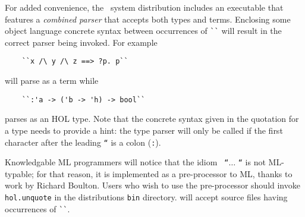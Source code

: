 For added convenience, the \HOL\ system distribution includes an
executable that features a {\it combined parser\/} that accepts both
types and terms. Enclosing some object language concrete syntax
between occurrences of \verb+``+ will result in the correct parser
being invoked. For example

\begin{verbatim}
    ``x /\ y /\ z ==> ?p. p``
\end{verbatim}

\noindent will parse as a term while

\begin{verbatim}
    ``:'a -> ('b -> 'h) -> bool``
\end{verbatim}

\noindent parses as an HOL type. Note that the concrete syntax given in
the quotation for a type needs to provide a hint: the type parser will
only be called if the first character after the leading {\tt ``} is a
colon (\verb+:+).

Knowledgable ML programmers will notice that the idiom {\tt
  ``}$\ldots$ {\tt ``} is not ML-typable; for that reason, it is
implemented as a pre-processor to ML, thanks to work by Richard
Boulton. Users who wish to use the pre-processor should invoke
\texttt{hol.unquote} in the distributions \texttt{bin} directory.
\holmake{} will accept source files having occurrences of \verb+``+.


